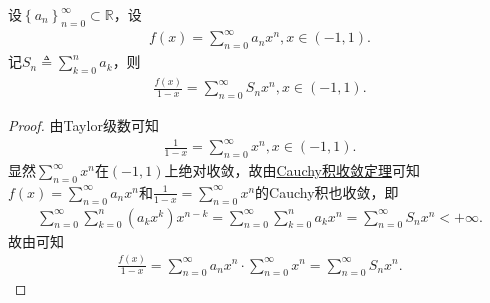 \documentclass[../../main.tex]{subfiles}
\begin{document}
\begin{proposition}\label{proposition:幂级数Cauchy积常用技巧}
设$\left\{ a_n \right\} _{n=0}^{\infty}\subset \mathbb{R}$，设
\begin{align*}
f\left( x \right) =\sum_{n=0}^{\infty}{a_nx^n},x\in \left( -1,1 \right) .
\end{align*}
记$S_n\triangleq \sum_{k=0}^n{a_k}$，则
\begin{align*}
\frac{f\left( x \right)}{1-x}=\sum_{n=0}^{\infty}{S_nx^n},x\in \left( -1,1 \right) .
\end{align*}
\end{proposition}
\begin{proof}
由Taylor级数可知
\begin{align*}
\frac{1}{1-x}=\sum_{n=0}^{\infty}{x^n},x\in \left( -1,1 \right) .
\end{align*}
显然$\sum_{n=0}^{\infty}{x^n}$在$\left( -1,1 \right)$上绝对收敛，故由\hyperref[theorem:Cauchy积收敛定理]{Cauchy积收敛定理}可知$f\left( x \right) =\sum_{n=0}^{\infty}{a_nx^n}$和$\frac{1}{1-x}=\sum_{n=0}^{\infty}{x^n}$的Cauchy积也收敛，即
\begin{align*}
\sum_{n=0}^{\infty}{\sum_{k=0}^n{\left( a_kx^k \right) x^{n-k}}}=\sum_{n=0}^{\infty}{\sum_{k=0}^n{a_kx^n}}=\sum_{n=0}^{\infty}{S_nx^n}<+\infty .
\end{align*}
故由可知
\begin{align*}
\frac{f\left( x \right)}{1-x}=\sum_{n=0}^{\infty}{a_nx^n}\cdot \sum_{n=0}^{\infty}{x^n}=\sum_{n=0}^{\infty}{S_nx^n}.
\end{align*}

\end{proof}
\end{document}

